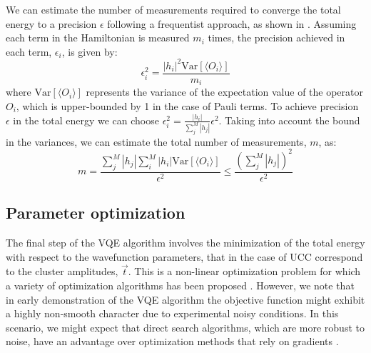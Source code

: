 \documentclass[superscriptaddress,aps,pra,twocolumn,nofootinbib,babel]{revtex4-1}
\newcommand{\jarrod}[1]{{\color{magenta}{#1}}}
\begin{document}
We can estimate the number of measurements required to converge the total energy to a precision $\epsilon$ following a frequentist approach, as shown in \cite{Wecker.PRA.92.042303.2015}. Assuming each term in the Hamiltonian is measured $m_i$ times, the precision achieved in each term, $\epsilon_i$, is given by:
\begin{equation}\label{eq:nmeast}
\epsilon_i^2=\frac{|h_i|^2 \text{Var}[\langle O_i \rangle]}{m_i}
\end{equation}
where $\text{Var}[\langle O_i \rangle]$ represents the variance of the expectation value of the operator $O_i$, which is upper-bounded by 1 in the case of Pauli terms. To achieve precision $\epsilon$ in the total energy we can choose $\epsilon_i^2 = \frac{|h_i|}{\sum^{M}_j|h_j|}\epsilon^2$. Taking into account the bound in the variances, we can estimate the total number of measurements, $m$, as:
\begin{equation}\label{eq:nmeas}
m = \frac{\sum^{M}_j |h_j| \sum^{M}_i |h_i|\text{Var}[\langle O_i \rangle]}{\epsilon^2} \le \frac{(\sum^{M}_j |h_j|)^2}{\epsilon^2}
\end{equation}

\subsection{Parameter optimization}

The final step of the VQE algorithm involves the minimization of the total energy with respect to the wavefunction parameters, that in the case of UCC correspond to the cluster amplitudes, $\vec{t}$. This is a non-linear optimization problem for which a variety of optimization algorithms has been proposed \cite{yang2017optimizing}. However, we note that in early demonstration of the VQE algorithm the objective function might exhibit a highly non-smooth character due to experimental noisy conditions. In this scenario, we might expect that direct search algorithms, which are more robust to noise, have an advantage over optimization methods that rely on gradients \cite{kolda.SIAMR.45.385.2003}.
\end{document}
